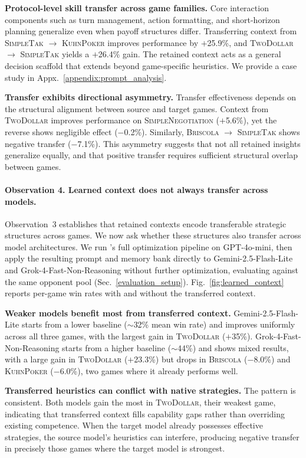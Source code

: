 \textbf{Protocol-level skill transfer across game families.}
Core interaction components such as turn management, action formatting, and short-horizon planning generalize even when payoff structures differ.
Transferring context from \textsc{SimpleTak} $\rightarrow$ \textsc{KuhnPoker} improves performance by $+$25.9\%, and \textsc{TwoDollar} $\rightarrow$ \textsc{SimpleTak} yields a $+$26.4\% gain.
The retained context acts as a general decision scaffold that extends beyond game-specific heuristics.
We provide a case study in Appx.~\ref{appendix:prompt_analysis}.

\textbf{Transfer exhibits directional asymmetry.}
Transfer effectiveness depends on the structural alignment between source and target games.
Context from \textsc{TwoDollar} improves performance on \textsc{SimpleNegotiation} ($+$5.6\%), yet the reverse shows negligible effect ($-$0.2\%).
Similarly, \textsc{Briscola} $\rightarrow$ \textsc{SimpleTak} shows negative transfer ($-$7.1\%).
This asymmetry suggests that not all retained insights generalize equally, and that positive transfer requires sufficient structural overlap between games.



\paragraph{Observation 4. Learned context does not always transfer across models.}


Observation~3 establishes that retained contexts encode transferable strategic structures across games. We now ask whether these structures also transfer across model architectures. We run \NAME{}'s full optimization pipeline on GPT-4o-mini, then apply the resulting prompt and memory bank directly to Gemini-2.5-Flash-Lite and Grok-4-Fast-Non-Reasoning without further optimization, evaluating against the same opponent pool (Sec.~\ref{evaluation_setup}). Fig.~\ref{fig:learned_context} reports per-game win rates with and without the transferred context.

\textbf{Weaker models benefit most from transferred context.}
Gemini-2.5-Flash-Lite starts from a lower baseline ($\sim$32\% mean win rate) and improves uniformly across all three games, with the largest gain in \textsc{TwoDollar} ($+$35\%). Grok-4-Fast-Non-Reasoning starts from a higher baseline ($\sim$44\%) and shows mixed results, with a large gain in \textsc{TwoDollar} ($+$23.3\%) but drops in \textsc{Briscola} ($-$8.0\%) and \textsc{KuhnPoker} ($-$6.0\%), two games where it already performs well.

\textbf{Transferred heuristics can conflict with native strategies.}
The pattern is consistent. Both models gain the most in \textsc{TwoDollar}, their weakest game, indicating that transferred context fills capability gaps rather than overriding existing competence. When the target model already possesses effective strategies, the source model's heuristics can interfere, producing negative transfer in precisely those games where the target model is strongest.

